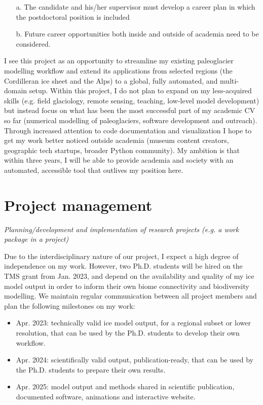 \documentclass{article}
\newcommand{\guideline}[1]{{\color{color2}\itshape{#1}}}
\begin{document}
    \guideline{
        \begin{itemize}
          \item[a.] The candidate and his/her supervisor must develop a career
            plan in which the postdoctoral position is included
          \item[b.] Future career opportunities both inside and outside of
            academia need to be considered.
        \end{itemize}}

    I see this project as an opportunity to streamline my existing paleoglacier
    modelling workflow and extend its applications from selected regions (the
    Cordilleran ice sheet and the Alps) to a global, fully automated, and
    multi-domain setup. Within this project, I do not plan to expand on my
    less-acquired skills (e.g. field glaciology, remote sensing, teaching,
    low-level model development) but instead focus on what has been the most
    successful part of my academic CV so far (numerical modelling of
    paleoglaciers, software development and outreach). Through increased
    attention to code documentation and visualization I hope to get my work
    better noticed outside academia (museum content creators, geographic tech
    startups,  broader Python community). My ambition is that within three
    years, I will be able to provide academia and society with an automated,
    accessible tool that outlives my position here.


\section{Project management}

\guideline{
    Planning/development and implementation of research projects (e.g. a work
    package in a project)}

    Due to the interdisciplinary nature of our project, I expect a high degree
    of independence on my work. However, two Ph.D. students will be hired on
    the TMS grant from Jan. 2023, and depend on the availability and quality
    of my ice model output in order to inform their own biome connectivity and
    biodiversity modelling. We maintain regular communication between all
    project members and plan the following milestones on my work:

    \begin{itemize}
      \item Apr. 2023: technically valid ice model output, for a regional
        subset or lower resolution, that can be used by the Ph.D. students to
        develop their own workflow.
      \item Apr. 2024: scientifically valid output, publication-ready, that can
        be used by the Ph.D. students to prepare their own results.
      \item Apr. 2025: model output and methods shared in scientific
        publication, documented software, animations and interactive website.
    \end{itemize}
\end{document}
